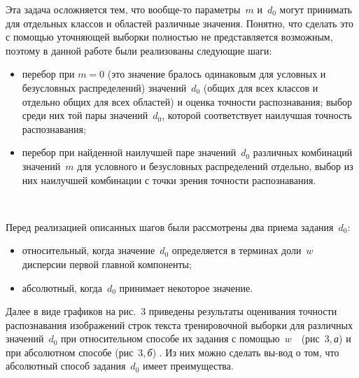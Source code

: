 \begin{multicols}{2}
Эта задача осложняется тем, что вообще-то параметры~$m$ и~$d_0$ могут принимать для 
отдельных классов и областей различные значения. Понятно, что сделать это с помощью 
уточняющей выборки полностью не представляется возможным, поэтому в данной работе были 
реализованы следующие шаги:
\begin{itemize}
\item перебор при $m=0$ (это значение бралось одинаковым для условных и безусловных 
распределений) значений~$d_0$ (общих для всех классов и отдельно общих для всех областей) и 
оценка точности распознавания; выбор среди них той пары значений~$d_0$, которой 
соответствует наилучшая точность распознавания;
\item перебор при найденной наилучшей паре значений~$d_0$ различных комбинаций 
значений~$m$ для условного и безусловных распределений отдельно, выбор из них наилучшей 
комбинации с точки зрения точности распознавания. 
\end{itemize}


 \begin{figure*} %
 \vspace*{1pt}
\begin{center} %
\vspace*{12pt}
\mbox{%
\epsfxsize=163.814mm
}
\end{center}
\vspace*{-9pt}
\end{figure*}


      Перед реализацией описанных шагов были рассмотрены два приема задания~$d_0$: 
      \begin{itemize}
\item относительный, когда значение~$d_0$ определяется в терминах доли~$w$ дисперсии первой 
главной компоненты;
\item абсолютный, когда~$d_0$ принимает некоторое значение.
\end{itemize}
      
      Далее в виде графиков на рис.~3 приведены результаты оценивания точности 
распознавания изображений строк текста тренировочной выборки для различных значений~$d_0$ 
при относительном способе их задания с помощью~$w$\ \ (рис~3,\,\textit{а}) и при абсолютном способе (рис~3,\,\textit{б}) . 
Из них можно 
сделать вы-\linebreak вод о том, что абсолютный способ задания~$d_0$ имеет преимущества.
    

\end{multicols}
